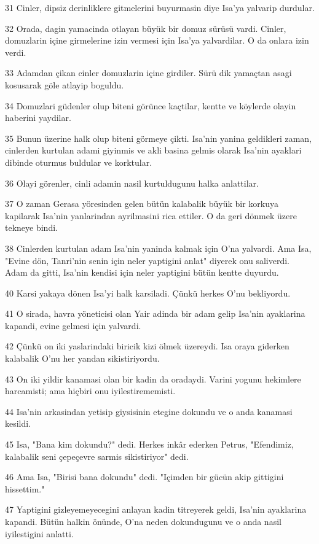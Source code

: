 \par 31 Cinler, dipsiz derinliklere gitmelerini buyurmasin diye Isa'ya yalvarip durdular.
\par 32 Orada, dagin yamacinda otlayan büyük bir domuz sürüsü vardi. Cinler, domuzlarin içine girmelerine izin vermesi için Isa'ya yalvardilar. O da onlara izin verdi.
\par 33 Adamdan çikan cinler domuzlarin içine girdiler. Sürü dik yamaçtan asagi kosusarak göle atlayip boguldu.
\par 34 Domuzlari güdenler olup biteni görünce kaçtilar, kentte ve köylerde olayin haberini yaydilar.
\par 35 Bunun üzerine halk olup biteni görmeye çikti. Isa'nin yanina geldikleri zaman, cinlerden kurtulan adami giyinmis ve akli basina gelmis olarak Isa'nin ayaklari dibinde oturmus buldular ve korktular.
\par 36 Olayi görenler, cinli adamin nasil kurtuldugunu halka anlattilar.
\par 37 O zaman Gerasa yöresinden gelen bütün kalabalik büyük bir korkuya kapilarak Isa'nin yanlarindan ayrilmasini rica ettiler. O da geri dönmek üzere tekneye bindi.
\par 38 Cinlerden kurtulan adam Isa'nin yaninda kalmak için O'na yalvardi. Ama Isa, "Evine dön, Tanri'nin senin için neler yaptigini anlat" diyerek onu saliverdi. Adam da gitti, Isa'nin kendisi için neler yaptigini bütün kentte duyurdu.
\par 40 Karsi yakaya dönen Isa'yi halk karsiladi. Çünkü herkes O'nu bekliyordu.
\par 41 O sirada, havra yöneticisi olan Yair adinda bir adam gelip Isa'nin ayaklarina kapandi, evine gelmesi için yalvardi.
\par 42 Çünkü on iki yaslarindaki biricik kizi ölmek üzereydi. Isa oraya giderken kalabalik O'nu her yandan sikistiriyordu.
\par 43 On iki yildir kanamasi olan bir kadin da oradaydi. Varini yogunu hekimlere harcamisti; ama hiçbiri onu iyilestirememisti.
\par 44 Isa'nin arkasindan yetisip giysisinin etegine dokundu ve o anda kanamasi kesildi.
\par 45 Isa, "Bana kim dokundu?" dedi. Herkes inkâr ederken Petrus, "Efendimiz, kalabalik seni çepeçevre sarmis sikistiriyor" dedi.
\par 46 Ama Isa, "Birisi bana dokundu" dedi. "Içimden bir gücün akip gittigini hissettim."
\par 47 Yaptigini gizleyemeyecegini anlayan kadin titreyerek geldi, Isa'nin ayaklarina kapandi. Bütün halkin önünde, O'na neden dokundugunu ve o anda nasil iyilestigini anlatti.
